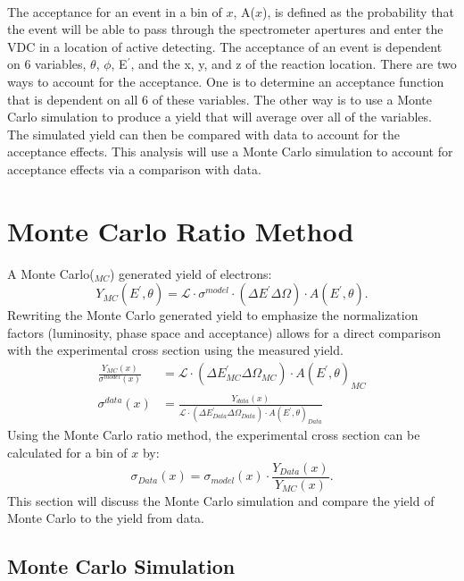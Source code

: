 \paragraph{} The acceptance for an event in a bin of $x$, A($x$), is defined as the probability that the event will be able to pass through the spectrometer apertures and enter the VDC in a location of active detecting. The acceptance of an event is dependent on 6 variables, $\theta$, $\phi$, E$^{\prime}$, and the x, y, and z of the reaction location. There are two ways to account for the acceptance. One is to determine an acceptance function that is dependent on all 6 of these variables. The other way is to use a Monte Carlo simulation to produce a yield that will average over all of the variables. The simulated yield can then be compared with data to account for the acceptance effects. This analysis will use a Monte Carlo simulation to account for acceptance effects via a comparison with data.
 \section{Monte Carlo Ratio Method}
 A Monte Carlo($_{MC}$) generated yield of electrons:
\begin{equation}
Y_{MC}(E^{\prime},\theta) = \mathscr{L} \cdot \sigma^{model} \cdot (\Delta E^{\prime} \Delta \Omega) \cdot A(E^{\prime},\theta).
\end{equation}
Rewriting the Monte Carlo generated yield to emphasize the normalization factors (luminosity, phase space and acceptance) allows for a direct comparison with the experimental cross section using the measured yield.
\begin{align}
\frac{Y_{MC}(x)}{\sigma^{model}(x)} &= \mathscr{L} \cdot (\Delta E^{\prime}_{MC} \Delta \Omega_{MC}) \cdot A(E^{\prime},\theta)_{MC} \\
\sigma^{data}(x) &= \frac{Y_{data}(x)}{ \mathscr{L} \cdot (\Delta E^{\prime}_{Data} \Delta \Omega_{Data}) \cdot A(E^{\prime},\theta)_{Data} }
\end{align}
Using the Monte Carlo ratio method, the experimental cross section can be calculated for a bin of $x$ by:
\begin{equation}
\sigma_{Data}(x) = \sigma_{model}(x) \cdot \frac{Y_{Data}(x)}{Y_{MC}(x)}.
\end{equation} 
This section will discuss the Monte Carlo simulation and compare the yield of Monte Carlo to the yield from data.

\subsection{Monte Carlo Simulation}

